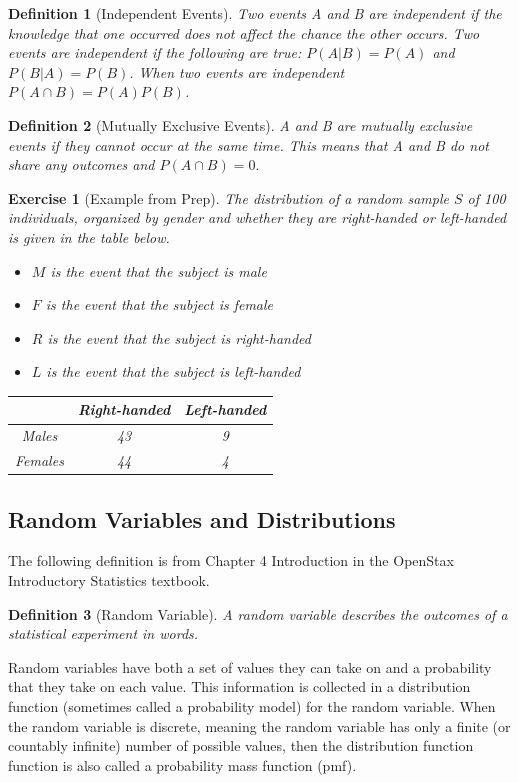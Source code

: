 \documentclass{article}
\theoremstyle{plain}
\theoremstyle{box}
\newtheorem*{definition*}{Definition}
\newtheorem*{exercise*}{Exercise}
\begin{document}
\begin{definition*}[Independent Events]
Two events A and B are independent if the knowledge that one occurred does not affect the chance the other occurs. Two events are independent if the following are true: $P(A|B) = P(A)$ and $P(B|A) = P(B)$. When two events are independent $P(A \cap B) = P(A)P(B)$.
\end{definition*}

\begin{definition*}[Mutually Exclusive Events]
A and B are mutually exclusive events if they cannot occur at the same time. This means that A and B do not share any outcomes and $P(A \cap B) = 0.$
\end{definition*}

\begin{exercise*}[Example from Prep]
The distribution of a random sample $S$ of 100 individuals, organized by gender and whether they are right-handed or left-handed is given in the table below.
\begin{itemize}
\item $M$ is the event that the subject is male
\item $F$ is the event that the subject is female
\item $R$ is the event that the subject is right-handed
\item $L$ is the event that the subject is left-handed
\end{itemize}

\begin{table}[h]
\begin{center}
\begin{tabular}{|c|c|c|}
\hline
& Right-handed & Left-handed\\
\hline
Males & 43 & 9\\
\hline
Females & 44 & 4\\
\hline
\end{tabular}
\end{center}
\end{table}
\end{exercise*}



\newpage
\subsection{Random Variables and Distributions}
\noindent The following definition is from Chapter 4 Introduction in the OpenStax Introductory Statistics textbook.
\begin{definition*}[Random Variable]
A random variable describes the outcomes of a statistical experiment in words.
\end{definition*}
Random variables have both a set of values they can take on and a probability that they take on each value. This information is collected in a distribution function (sometimes called a probability model) for the random variable. When the random variable is discrete, meaning the random variable has only a finite (or countably infinite) number of possible values, then the distribution function function is also called a probability mass function (pmf).
\end{document}
